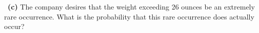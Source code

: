 \documentclass[a4 paper]{article}
\numberwithin{equation}{section}
\newcommand{\subproblem}[1]{~\newline\textbf{(#1)}}
\newcommand{\0}{\mathbf{0}}
\begin{document}
\subproblem{c} The company desires that the weight exceeding 26 ounces be an extremely rare occurrence. What is the probability that this rare occurrence does actually occur?\newline
{}
\newline {}
\newline {}
\newline {}
\newline {}
\newline {}
\newline
\end{document}
